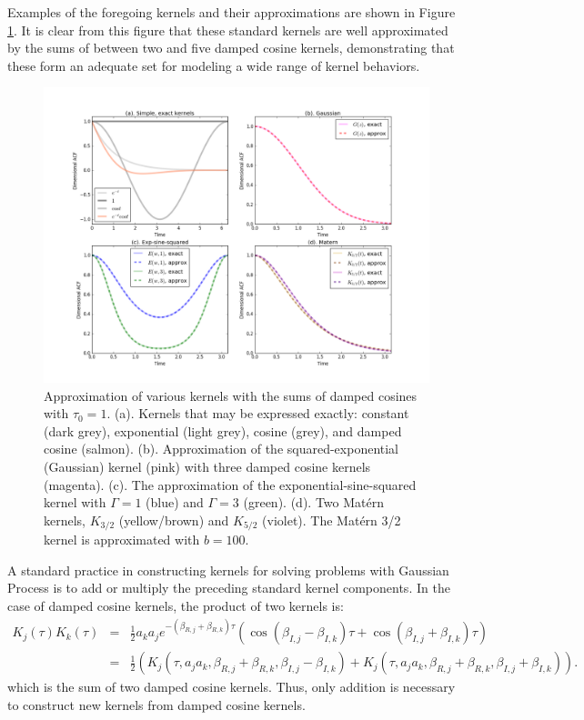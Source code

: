 \documentclass[manuscript, letterpaper]{aastex6}
\begin{document}
Examples of the foregoing kernels and their approximations are shown in Figure \ref{kernel_approx}.
It is clear from this figure that these standard kernels are well approximated by the sums
of between two and five damped cosine kernels, demonstrating that these form an adequate set
for modeling a wide range of kernel behaviors.

\begin{figure}[!htbp]
\begin{center}
\includegraphics[width=\textwidth]{kernel_approx.png}
\caption{Approximation of various kernels with the sums of damped cosines with $\tau_0=1$. 
(a). Kernels that may be expressed exactly: constant (dark grey), exponential (light grey), 
cosine (grey), and damped cosine (salmon).
(b). Approximation of the squared-exponential (Gaussian) kernel (pink) with three
damped cosine kernels (magenta). (c). The approximation of the exponential-sine-squared
kernel with $\Gamma =1$ (blue) and $\Gamma = 3$ (green). (d). Two Mat\'ern kernels,
$K_{3/2}$ (yellow/brown) and $K_{5/2}$ (violet).  The Mat\'ern 3/2 kernel
is approximated with $b=100$. }
\label{kernel_approx}
\end{center}
\end{figure}

A standard practice in constructing kernels for solving problems with Gaussian Process
is to add or multiply the preceding standard kernel components.  In the case of damped cosine
kernels, the product of two kernels is: 
\begin{eqnarray}
K_j(\tau)K_k(\tau) &=&
\frac{1}{2} a_k a_j e^{-(\beta_{R,j}+\beta_{R,k}) \tau} \left(\cos{(\beta_{I,j}-\beta_{I,k})\tau}+\cos{(\beta_{I,j}+\beta_{I,k})\tau}\right)\\
&=& \frac{1}{2} \left(K_j(\tau,a_ja_k,\beta_{R,j}+\beta_{R,k},\beta_{I,j}-\beta_{I,k}) +K_j(\tau,a_ja_k,\beta_{R,j}+\beta_{R,k},\beta_{I,j}+\beta_{I,k})\right).
\end{eqnarray}
which is the sum of two damped cosine kernels.  Thus, only addition is necessary to
construct new kernels from damped cosine kernels.
\end{document}
